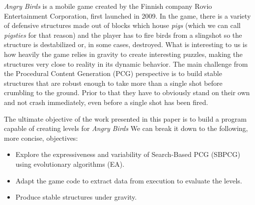 \documentclass[runningheads,a4paper]{llncs}
\begin{document}
\textit{Angry Birds} is a mobile game created by the Finnish company Rovio Entertainment 
Corporation\cite{angry-birds}, first launched in 2009. 
In the game, there is a variety of defensive structures made out of
blocks which house {\em pigs} (which we can call {\em pigsties} for
that reason)
and the player has to fire birds from a slingshot
so the structure is destabilized or, in some cases, destroyed.
What is interesting to us is how heavily the 
game relies in gravity to create interesting puzzles, making the
structures very close to reality in its dynamic behavior. The main challenge 
from 
the Procedural Content Generation (PCG) perspective is to build stable
structures that are robust enough to take more than a single shot
before crumbling to the ground. Prior to that they have to obviously
stand on their own and not crash immediately, even before a single
shot has been fired.



The ultimate objective of the work presented in this paper is to
build a program capable of creating levels for \textit{Angry Birds}
We can break it down to the following, more concise, objectives: 

\begin{itemize}
	\item Explore the expressiveness and variability of Search-Based PCG (SBPCG) using
	evolutionary algorithms (EA).
	\item Adapt the game code to extract data from execution to 
	evaluate the levels.
	\item Produce stable structures under gravity.
\end{itemize} 
\end{document}
